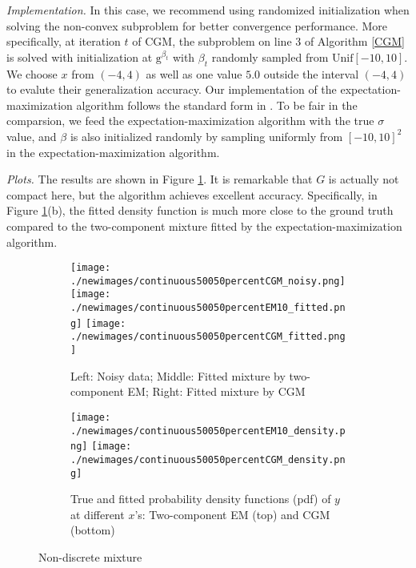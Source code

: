 \documentclass[11pt]{article}
\numberwithin{equation}{section}
\newcommand{\EM}{expectation-maximization }
\newcommand{\gv}{\mathrm{g}}
\begin{document}
\emph{Implementation. } In this case, we recommend using randomized initialization when solving the non-convex subproblem for better convergence performance. More specifically, at iteration $t$ of CGM, the subproblem on line 3 of Algorithm \ref{CGM} is solved with initialization at $\gv^{\beta_t}$ with $\beta_t$ randomly sampled from $\mathrm{Unif}[-10,10]$. We choose $x$ from $(-4,4)$ as well as one value $5.0$ outside the interval $(-4,4)$  to evalute their generalization accuracy. Our implementation of the expectation-maximization algorithm follows the standard form in \citet{faria2010fitting}. To be fair in the comparsion, we feed the expectation-maximization algorithm with the true $\sigma$ value, and $\beta$ is also initialized randomly by sampling uniformly from $[-10,10]^2$ in the \EM algorithm.

\emph{Plots. } The results are shown in Figure \ref{fig:continuous}. It is remarkable that $G$ is actually not compact here, but the algorithm achieves excellent accuracy. Specifically, in Figure \ref{fig:continuous}(b), the fitted density function is much more close to the ground truth compared to the two-component mixture fitted by the \EM algorithm.

\begin{figure}[!htbp]
\begin{subfigure}[b]{\textwidth}
\texttt{[image: ./newimages/continuous50050percentCGM\_noisy.png]}
\texttt{[image: ./newimages/continuous50050percentEM10\_fitted.png]}
\texttt{[image: ./newimages/continuous50050percentCGM\_fitted.png]}
\caption{Left: Noisy data; Middle: Fitted mixture by two-component EM; Right: Fitted mixture by CGM}
\end{subfigure}

\begin{subfigure}[b]{\textwidth}
\texttt{[image: ./newimages/continuous50050percentEM10\_density.png]}
\texttt{[image: ./newimages/continuous50050percentCGM\_density.png]}
\caption{True and fitted probability density functions (pdf) of $y$ at different $x$'s: Two-component EM (top) and CGM (bottom) }
\end{subfigure}
\caption{Non-discrete mixture }
\label{fig:continuous}
\end{figure}
\end{document}
